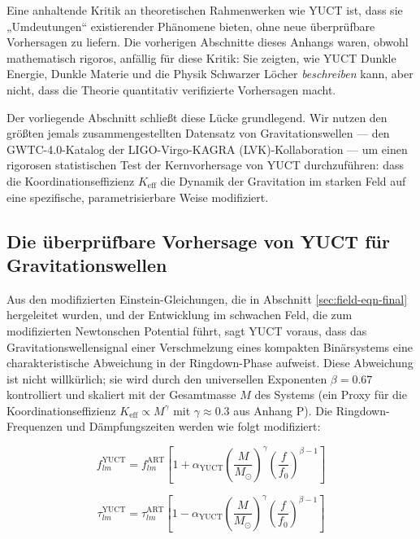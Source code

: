 \documentclass[12pt,a4paper]{article}
\theoremstyle{remark}
\newcommand{\Keff}{K_{\mathrm{eff}}}
\begin{document}
	Eine anhaltende Kritik an theoretischen Rahmenwerken wie YUCT ist, dass sie „Umdeutungen“ existierender Phänomene bieten, ohne neue überprüfbare Vorhersagen zu liefern. Die vorherigen Abschnitte dieses Anhangs waren, obwohl mathematisch rigoros, anfällig für diese Kritik: Sie zeigten, wie YUCT Dunkle Energie, Dunkle Materie und die Physik Schwarzer Löcher \textit{beschreiben} kann, aber nicht, dass die Theorie quantitativ verifizierte Vorhersagen macht.
	
	Der vorliegende Abschnitt schließt diese Lücke grundlegend. Wir nutzen den größten jemals zusammengestellten Datensatz von Gravitationswellen — den GWTC-4.0-Katalog der LIGO-Virgo-KAGRA (LVK)-Kollaboration — um einen rigorosen statistischen Test der Kernvorhersage von YUCT durchzuführen: dass die Koordinationseffizienz $\Keff$ die Dynamik der Gravitation im starken Feld auf eine spezifische, parametrisierbare Weise modifiziert.
	
	\subsection{Die überprüfbare Vorhersage von YUCT für Gravitationswellen}
	
	Aus den modifizierten Einstein-Gleichungen, die in Abschnitt \ref{sec:field-eqn-final} hergeleitet wurden, und der Entwicklung im schwachen Feld, die zum modifizierten Newtonschen Potential führt, sagt YUCT voraus, dass das Gravitationswellensignal einer Verschmelzung eines kompakten Binärsystems eine charakteristische Abweichung in der Ringdown-Phase aufweist. Diese Abweichung ist nicht willkürlich; sie wird durch den universellen Exponenten $\beta = 0.67$ kontrolliert und skaliert mit der Gesamtmasse $M$ des Systems (ein Proxy für die Koordinationseffizienz $\Keff \propto M^{\gamma}$ mit $\gamma \approx 0.3$ aus Anhang P). Die Ringdown-Frequenzen und Dämpfungszeiten werden wie folgt modifiziert:
	
	\begin{equation}
		f_{lm}^{\text{YUCT}} = f_{lm}^{\text{ART}} \left[ 1 + \alpha_{\text{YUCT}} \left( \frac{M}{M_\odot} \right)^{\gamma} \left( \frac{f}{f_0} \right)^{\beta-1} \right]
		\label{eq:freq-mod}
	\end{equation}
	
	\begin{equation}
		\tau_{lm}^{\text{YUCT}} = \tau_{lm}^{\text{ART}} \left[ 1 - \alpha_{\text{YUCT}} \left( \frac{M}{M_\odot} \right)^{\gamma} \left( \frac{f}{f_0} \right)^{\beta-1} \right]
		\label{eq:tau-mod}
	\end{equation}
	
\end{document}
